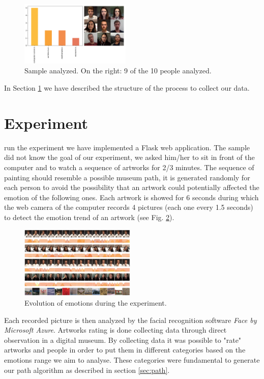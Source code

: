 \documentclass[journal, a4paper]{IEEEtran}
\begin{document}
\begin{figure}[h]
    \centering
    \includegraphics[width=0.47\textwidth]{samplesample.png}
    \caption{Sample analyzed. On the right: 9 of the 10 people analyzed.}
    \label{fig:sample}
\end{figure}


In Section \ref{sec:experiment} we have described the structure of the process to collect our data.

\section{Experiment} \label{sec:experiment}
 run the experiment we have implemented a Flask web application. The sample did not know the goal of our experiment, we asked him/her to sit in front of the computer and to watch a sequence of artworks for 2/3 minutes. The sequence of painting should resemble a possible museum path, it is generated randomly for each person to avoid the possibility that an artwork could potentially affected the emotion of the following ones. Each artwork is showed for 6 seconds during which the web camera of the computer records 4 pictures (each one every 1.5 seconds) to detect the emotion trend of an artwork (see Fig. \ref{fig:time}). 
\begin{figure}[h]
    \centering
    \includegraphics[width=0.49\textwidth]{timeemotion.png}
    \caption{Evolution of emotions during the experiment.}
    \label{fig:time}
\end{figure}
Each recorded picture is then analyzed by the facial recognition software \textit{Face by Microsoft Azure}. Artworks rating is done collecting data through direct observation in a digital museum. By collecting data it was possible to "rate" artworks and people in order to put them in different categories based on the emotions range we aim to analyse. These categories were fundamental to generate our path algorithm as described in section \ref{sec:path}.
\end{document}
